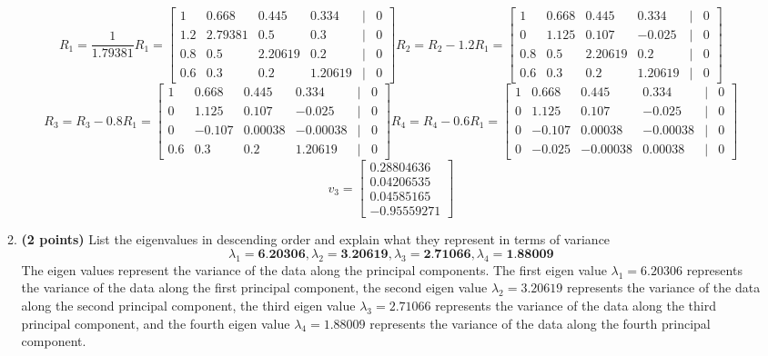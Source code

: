 \documentclass[a3paper,12pt]{extarticle} %
\begin{document}
\begin{enumerate}
\begin{enumerate}
\[        \]
        \[
        R_1 = \frac{1}{1.79381}R_1 = \begin{bmatrix}1 & 0.668 & 0.445 & 0.334 & | & 0\\1.2 & 2.79381 & 0.5 & 0.3 & | & 0\\0.8 & 0.5 & 2.20619 & 0.2 & | & 0\\0.6 & 0.3 & 0.2 & 1.20619 & | & 0\end{bmatrix}
        R_2 = R_2 - 1.2R_1 = \begin{bmatrix}1 & 0.668 & 0.445 & 0.334 & | & 0\\0 & 1.125 & 0.107 & -0.025 & | & 0\\0.8 & 0.5 & 2.20619 & 0.2 & | & 0\\0.6 & 0.3 & 0.2 & 1.20619 & | & 0\end{bmatrix}
        \]
        \[
        R_3 = R_3 - 0.8R_1 = \begin{bmatrix}1 & 0.668 & 0.445 & 0.334 & | & 0\\0 & 1.125 & 0.107 & -0.025 & | & 0\\0 & -0.107 & 0.00038 & -0.00038 & | & 0\\0.6 & 0.3 & 0.2 & 1.20619 & | & 0\end{bmatrix}
        R_4 = R_4 - 0.6R_1 = \begin{bmatrix}1 & 0.668 & 0.445 & 0.334 & | & 0\\0 & 1.125 & 0.107 & -0.025 & | & 0\\0 & -0.107 & 0.00038 & -0.00038 & | & 0\\0 & -0.025 & -0.00038 & 0.00038 & | & 0\end{bmatrix}
        \]
        \[
        v_3 = \begin{bmatrix}0.28804636\\0.04206535\\0.04585165\\-0.95559271\end{bmatrix}
        \]
        \item \textbf{(2 points)} List the eigenvalues in descending order and explain what they represent in terms of variance
        \[
        \lambda_1 = \textbf{6.20306}, \lambda_2 = \textbf{3.20619}, \lambda_3 = \textbf{2.71066}, \lambda_4 = \textbf{1.88009}
        \]
        The eigen values represent the variance of the data along the principal components. The first eigen value \(\lambda_1 = 6.20306\) represents the variance of the data along the first principal component, the second eigen value \(\lambda_2 = 3.20619\) represents the variance of the data along the second principal component, the third eigen value \(\lambda_3 = 2.71066\) represents the variance of the data along the third principal component, and the fourth eigen value \(\lambda_4 = 1.88009\) represents the variance of the data along the fourth principal component.

\end{enumerate}
\end{enumerate}
\end{document}

